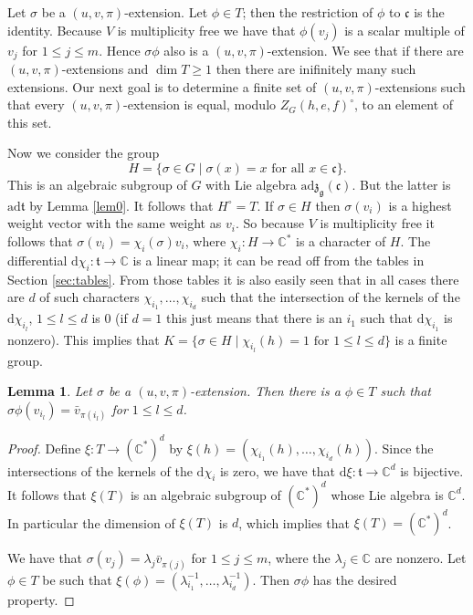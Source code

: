 \documentclass[a4paper,10pt]{amsart}
\newcommand{\C}{\mathbb{C}}
\newcommand{\mf}{\mathfrak}
\newcommand{\g}{\mf{g}}
\renewcommand{\c}{\mf{c}}
\newcommand{\z}{\mf{z}}
\newcommand{\ttt}{\mf{t}}
\newcommand{\ad}{\mathrm{ad}}
\numberwithin{equation}{section}
\newtheorem{lemma}[theorem]{Lemma}
\theoremstyle{remark}
\theoremstyle{remark}
\begin{document}
Let $\sigma$ be a $(u,v,\pi)$-extension. Let $\phi\in T$; then the restriction
of $\phi$ to $\c$ is the identity. Because $V$ is multiplicity free we have that
$\phi(v_j)$ is a scalar multiple of $v_j$ for $1\leq j\leq m$. Hence
$\sigma\phi$ also is a $(u,v,\pi)$-extension. We see that if there are
$(u,v,\pi)$-extensions and $\dim T\geq 1$ then there are inifinitely many
such extensions. Our next goal is to determine a finite set of
$(u,v,\pi)$-extensions such that every $(u,v,\pi)$-extension is equal, modulo
$Z_G(h,e,f)^\circ$, to an element of this set. 

Now we consider the group
$$H = \{ \sigma\in G \mid \sigma(x)=x \text{ for all } x \in \c\}.$$
This is an algebraic subgroup of $G$ with Lie algebra $\ad\z_\g(\c)$. But the
latter is $\ad\ttt$ by Lemma \ref{lem0}. It follows that $H^\circ = T$.
If $\sigma\in H$ then $\sigma(v_i)$ is a highest weight vector with the same
weight as $v_i$. So because $V$ is multiplicity free it follows that
$\sigma(v_i) = \chi_i(\sigma)v_i$, where $\chi_i : H\to \C^*$ is a character
of $H$. The differential $\mathrm{d} \chi_i : \ttt\to \C$ is a linear map;
it can be read off from the tables in Section \ref{sec:tables}. From those
tables it is also easily seen that in all cases there are $d$ of such
characters $\chi_{i_1},\ldots, \chi_{i_d}$ such that the intersection of
the kernels of the $\mathrm{d} \chi_{i_l}$, $1\leq l\leq d$ is 0 (if $d=1$ this
just means that there is an $i_1$ such that $\mathrm{d} \chi_{i_1}$ is nonzero).
This implies
that $K=\{ \sigma\in H \mid \chi_{i_l}(h)=1 \text{ for } 1\leq l\leq d\}$ is a
finite group.

\begin{lemma}\label{lem5}
Let $\sigma$ be a $(u,v,\pi)$-extension. Then there is a $\phi\in T$ such that
$\sigma\phi(v_{i_l})= \bar v_{\pi(i_l)}$ for $1\leq l\leq d$. 
\end{lemma}  

\begin{proof}
Define $\xi : T\to (\C^*)^d$ by $\xi(h) = (\chi_{i_1}(h),\ldots,\chi_{i_d}(h))$.
Since the intersections of the kernels of the $\mathrm{d}\chi_i$ is zero,
we have that $\mathrm{d}\xi : \ttt\to \C^d$ is bijective. It follows that
$\xi(T)$ is an algebraic subgroup of $(\C^*)^d$ whose Lie algebra is
$\C^d$. In particular the dimension of $\xi(T)$ is $d$, which implies that
$\xi(T) = (\C^*)^d$.

We have that $\sigma(v_j) = \lambda_j \bar v_{\pi(j)}$ for $1\leq j\leq m$,
where the $\lambda_j\in \C$ are nonzero. 
Let $\phi\in T$ be such that $\xi(\phi) = (\lambda_{i_1}^{-1},\ldots,
\lambda_{i_d}^{-1})$. Then $\sigma\phi$ has the desired property.
\end{proof}
\end{document}
